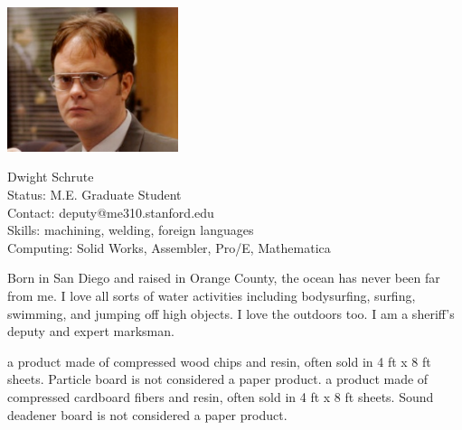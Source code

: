 \begin{framed}
\noindent \includegraphics[width=50mm]{Figures/Ch2/Dwight}
\parbox[b]{0.6\textwidth}{Dwight Schrute\\
Status: M.E. Graduate Student\\
Contact: deputy@me310.stanford.edu\\
Skills: machining, welding, foreign languages\\
Computing: Solid Works, Assembler, Pro/E, Mathematica\\
}

Born in San Diego and raised in Orange County, the ocean has never been far from me. I love all sorts of water activities including bodysurfing, surfing, swimming, and jumping off high objects. I love the outdoors too. I am a sheriff's deputy and expert marksman.\\
\end{framed}


 {a product made of compressed wood chips and resin, often sold in 4 ft x 8 ft sheets. Particle board is not considered a paper product.}
 {a product made of compressed cardboard fibers and resin, often sold in 4 ft x 8 ft sheets. Sound deadener board is not considered a paper product.}


